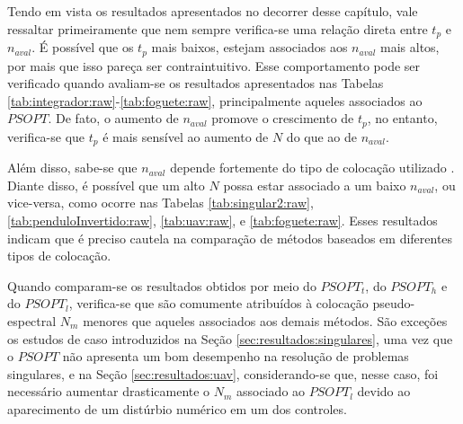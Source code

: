 
Tendo em vista os resultados apresentados no decorrer desse capítulo, vale ressaltar primeiramente que nem sempre verifica-se uma relação direta entre $ t_p $ e $ n_{aval} $. É possível que os $ t_p $ mais baixos, estejam associados aos $ n_{aval} $ mais altos, por mais que isso pareça ser contraintuitivo. Esse comportamento pode ser verificado quando avaliam-se os resultados apresentados nas Tabelas \ref{tab:integrador:raw}-\ref{tab:foguete:raw}, principalmente aqueles associados ao $ PSOPT $. De fato, o aumento de $ n_{aval} $ promove o crescimento de $ t_p $, no entanto, verifica-se que $ t_p $ é mais sensível ao aumento de $ N $ do que ao de $ n_{aval} $.


Além disso, sabe-se que $ n_{aval} $ depende fortemente do tipo de colocação utilizado \cite{kelly_introduction_2017}. Diante disso, é possível que um alto $ N $ possa estar associado a um baixo $ n_{aval} $, ou vice-versa, como ocorre nas Tabelas \ref{tab:singular2:raw}, \ref{tab:penduloInvertido:raw}, \ref{tab:uav:raw}, e \ref{tab:foguete:raw}. Esses resultados indicam que é preciso cautela na comparação de métodos baseados em diferentes tipos de colocação. 


Quando comparam-se os resultados obtidos por meio do $ PSOPT_t $, do $ PSOPT_h $ e do $ PSOPT_l $, verifica-se que são comumente atribuídos à colocação pseudo-espectral $ N_m $ menores que aqueles associados aos demais métodos. São exceções os estudos de caso introduzidos na Seção \ref{sec:resultados:singulares}, uma vez que o $ PSOPT $ não apresenta um bom desempenho na resolução de problemas singulares, e na Seção \ref{sec:resultados:uav}, considerando-se que, nesse caso, foi necessário aumentar drasticamente o $ N_m $ associado ao $ PSOPT_l $ devido ao aparecimento de um distúrbio numérico em um dos controles. 


